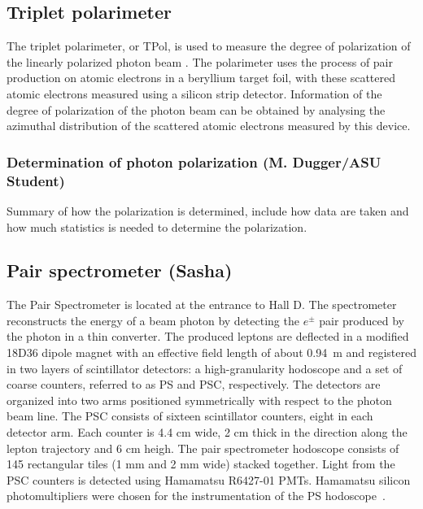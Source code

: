 \subsection{Triplet polarimeter \label{sec:tpol}}
The triplet polarimeter, or TPol, is used to measure the degree of polarization of the linearly polarized photon beam \cite{DUGGER2017115}.
The polarimeter uses the process of pair production on atomic electrons in a beryllium target foil, with these scattered atomic electrons measured using a silicon strip detector.
Information of the degree of polarization of the photon beam can be obtained by analysing the azimuthal distribution of the scattered atomic electrons measured by this device.

\subsubsection{Determination of photon polarization (M. Dugger/ASU Student)\label{sec:polarization}}
{\color{red} Summary of how the polarization is determined, include how data are taken and how much statistics is needed to determine the polarization}.

\subsection{Pair spectrometer         (Sasha) \label{sec:ps}}

The Pair Spectrometer \cite{BARBOSA2015376} is located at the entrance to Hall D.
The spectrometer reconstructs the energy of a beam photon by detecting the $e^\pm$ pair produced by the photon in a thin converter. 
The produced leptons are deflected in a modified 18D36 dipole magnet with an effective field length of about 0.94~m and registered in two layers of scintillator
detectors: a high-granularity hodoscope and a set of coarse counters,
referred to as PS and PSC, respectively. The detectors are organized into two arms positioned symmetrically with respect to the photon beam line. The PSC consists of sixteen scintillator counters, eight in each detector arm. Each counter is 4.4 cm wide, 2 cm thick in the direction along the lepton trajectory and 6 cm heigh. The pair spectrometer hodoscope consists of 145 rectangular 
tiles (1 mm and 2 mm wide) stacked together. Light from the PSC counters is detected using Hamamatsu R6427-01 PMTs. Hamamatsu silicon photomultipliers were chosen for the instrumentation of the PS hodoscope~\cite{Barbosa:2017zzw,Somov:2017kif,Tolstukhin:2014zsa}.

